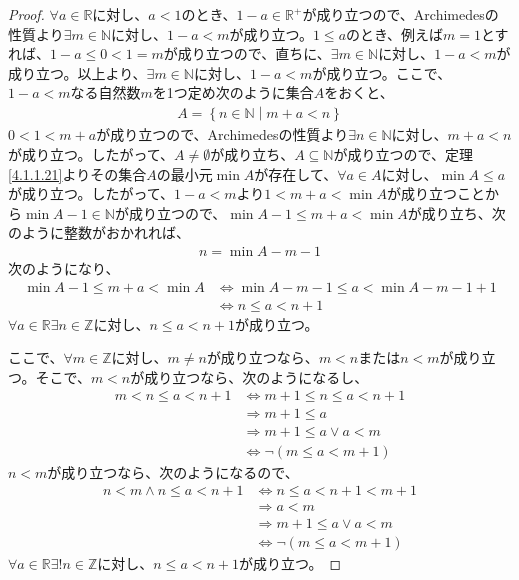 \documentclass[dvipdfmx]{jsarticle}
\begin{document}
\begin{proof}
$\forall a \in \mathbb{R}$に対し、$a < 1$のとき、$1 - a \in \mathbb{R}^{+}$が成り立つので、Archimedesの性質より$\exists m \in \mathbb{N}$に対し、$1 - a < m$が成り立つ。$1 \leq a$のとき、例えば$m = 1$とすれば、$1 - a \leq 0 < 1 = m$が成り立つので、直ちに、$\exists m \in \mathbb{N}$に対し、$1 - a < m$が成り立つ。以上より、$\exists m \in \mathbb{N}$に対し、$1 - a < m$が成り立つ。ここで、$1 - a < m$なる自然数$m$を1つ定め次のように集合$A$をおくと、
\begin{align*}
A = \left\{ n \in \mathbb{N} \middle| m + a < n \right\}
\end{align*}
$0 < 1 < m + a$が成り立つので、Archimedesの性質より$\exists n \in \mathbb{N}$に対し、$m + a < n$が成り立つ。したがって、$A \neq \emptyset$が成り立ち、$A \subseteq \mathbb{N}$が成り立つので、定理\ref{4.1.1.21}よりその集合$A$の最小元$\min A$が存在して、$\forall a \in A$に対し、$\min A \leq a$が成り立つ。したがって、$1 - a < m$より$1 < m + a < \min A$が成り立つことから$\min A - 1 \in \mathbb{N}$が成り立つので、$\min A - 1 \leq m + a < \min A$が成り立ち、次のように整数がおかれれば、
\begin{align*}
n = \min A - m - 1
\end{align*}
次のようになり、
\begin{align*}
\min A - 1 \leq m + a < \min A &\Leftrightarrow \min A - m - 1 \leq a < \min A - m - 1 + 1\\
&\Leftrightarrow n \leq a < n + 1
\end{align*}
$\forall a \in \mathbb{R}\exists n \in \mathbb{Z}$に対し、$n \leq a < n + 1$が成り立つ。\par
ここで、$\forall m \in \mathbb{Z}$に対し、$m \neq n$が成り立つなら、$m < n$または$n < m$が成り立つ。そこで、$m < n$が成り立つなら、次のようになるし、
\begin{align*}
m < n \leq a < n + 1 &\Leftrightarrow m + 1 \leq n \leq a < n + 1\\
&\Rightarrow m + 1 \leq a\\
&\Rightarrow m + 1 \leq a \vee a < m\\
&\Leftrightarrow \neg(m \leq a < m + 1)
\end{align*}
$n < m$が成り立つなら、次のようになるので、
\begin{align*}
n < m \land n \leq a < n + 1 &\Leftrightarrow n \leq a < n + 1 < m + 1\\
&\Rightarrow a < m\\
&\Rightarrow m + 1 \leq a \vee a < m\\
&\Leftrightarrow \neg(m \leq a < m + 1)
\end{align*}
$\forall a \in \mathbb{R}\exists!n \in \mathbb{Z}$に対し、$n \leq a < n + 1$が成り立つ。
\end{proof}
\end{document}
